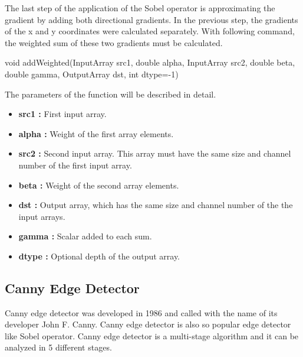 The last step of the application of the Sobel operator is approximating the gradient by adding both directional gradients. In the previous step, the gradients of the x and y coordinates were calculated separately. With following command, the weighted sum of these two gradients must be calculated.\cite{addWeighted}

 \begin{center}
 
void addWeighted(InputArray src1, double alpha, InputArray src2, double beta, double gamma, OutputArray dst, int dtype=-1)
 
  \end{center}
  
  The parameters of the function will be described in detail.
  
    \begin{itemize}

\item \textbf{src1 : }First input array.

\item \textbf{alpha : }Weight of the first array elements.

\item \textbf{src2 : }Second input array. This array must have the same size and channel number of the first input array.

\item \textbf{beta : }Weight of the second array elements.

\item \textbf{dst : }Output array, which has the same size and channel number of the the input arrays.

\item \textbf{gamma : }Scalar added to each sum.

\item \textbf{dtype : }Optional depth of the output array.

 \end{itemize}






 
%
\subsection{Canny Edge Detector}\label{sec:Canny Edge Detector}

Canny edge detector was developed in 1986 and called with the name of its developer John F. Canny. Canny edge detector is also so popular edge detector like Sobel operator. Canny edge detector is a multi-stage algorithm and it can be analyzed in 5 different stages.\cite{Canny_Edge_Detector2}

